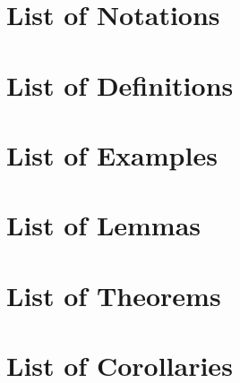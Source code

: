 
\section{List of Notations}

\section{List of Definitions}

\section{List of Examples}

\section{List of Lemmas}

\section{List of Theorems}

\section{List of Corollaries}

